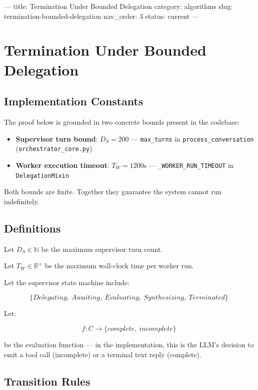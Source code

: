 ---
title: Termination Under Bounded Delegation
category: algorithms
slug: termination-bounded-delegation
nav_order: 3
status: current
---

\section{Termination Under Bounded Delegation}

\subsection*{Implementation Constants}

The proof below is grounded in two concrete bounds present in the codebase:

\begin{itemize}
  \item \textbf{Supervisor turn bound}: $D_S = 200$ — \texttt{max\_turns} in
        \texttt{process\_conversation} (\texttt{orchestrator\_core.py})
  \item \textbf{Worker execution timeout}: $T_W = 1200\text{s}$ —
        \texttt{\_WORKER\_RUN\_TIMEOUT} in \texttt{DelegationMixin}
\end{itemize}

Both bounds are finite. Together they guarantee the system cannot run indefinitely.

\subsection*{Definitions}

Let $D_S \in \mathbb{N}$ be the maximum supervisor turn count.

Let $T_W \in \mathbb{R}^+$ be the maximum wall-clock time per worker run.

Let the supervisor state machine include:

\[ \{Delegating,\ Awaiting,\ Evaluating,\ Synthesizing,\ Terminated\} \]

Let:

\[ f: C \rightarrow \{complete,\ incomplete\} \]

be the evaluation function — in the implementation, this is the LLM's decision
to emit a tool call (incomplete) or a terminal text reply (complete).

\subsection*{Transition Rules}

